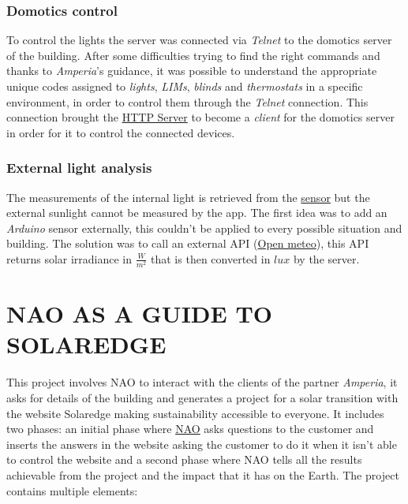 \documentclass{optica-article}
\begin{document}
\vspace{8pt}
\subsubsection{Domotics control}\label{sec:domotics_domotics_server}
To control the lights the server was connected via \emph{Telnet} to the domotics server of the building. After some difficulties trying to find the right commands and thanks to \emph{Amperia}'s guidance, it was possible to understand the appropriate unique codes assigned to \emph{lights}, \emph{LIMs}, \emph{blinds} and \emph{thermostats} in a specific environment, in order to control them through the \emph{Telnet} connection. This connection brought the \hyperref[sec:domotics_server]{HTTP Server} to become a \emph{client} for the domotics server in order for it to control the connected devices.

\vspace{8pt}
\subsubsection{External light analysis}
The measurements of the internal light is retrieved from the \hyperref[sec:domotics_sensor]{sensor} but the external sunlight cannot be measured by the app. The first idea was to add an \emph{Arduino} sensor externally, this couldn't be applied to every possible situation and building. The solution was to call an external API (\href{https://open-meteo.com/}{Open meteo}), this API returns solar irradiance in $\frac{W}{m^2}$ that is then converted in $lux$ by the server. 

\bigskip 
\section{NAO AS A GUIDE TO SOLAREDGE}\label{sec:solaredge_project}

This project involves NAO to interact with the clients of the partner \emph{Amperia}, it asks for details of the building and generates a project for a solar transition with the website Solaredge making sustainability accessible to everyone. It includes two phases: an initial phase where \hyperref[sec:solaredge_nao]{NAO} asks questions to the customer and inserts the answers in the website asking the customer to do it when it isn't able to control the website and a second phase where NAO tells all the results achievable from the project and the impact that it has on the Earth. The project contains multiple elements:\\
\end{document}
